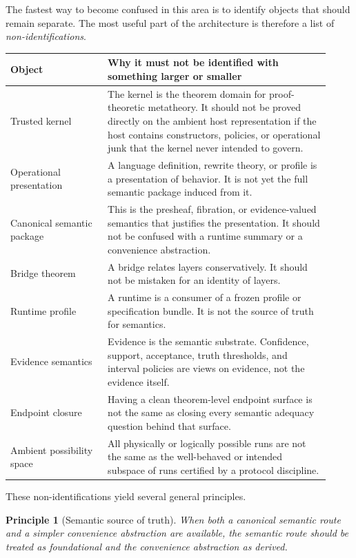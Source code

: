 \documentclass[11pt]{article}
\newtheorem{principle}{Principle}
\begin{document}
The fastest way to become confused in this area is to identify objects that should remain separate. The most useful part of the architecture is therefore a list of \emph{non-identifications}.

\begin{center}
\begin{tabular}{p{0.28\linewidth} p{0.64\linewidth}}
\toprule
Object & Why it must not be identified with something larger or smaller \\
\midrule
Trusted kernel & The kernel is the theorem domain for proof-theoretic metatheory. It should not be proved directly on the ambient host representation if the host contains constructors, policies, or operational junk that the kernel never intended to govern. \\
Operational presentation & A language definition, rewrite theory, or profile is a presentation of behavior. It is not yet the full semantic package induced from it. \\
Canonical semantic package & This is the presheaf, fibration, or evidence-valued semantics that justifies the presentation. It should not be confused with a runtime summary or a convenience abstraction. \\
Bridge theorem & A bridge relates layers conservatively. It should not be mistaken for an identity of layers. \\
Runtime profile & A runtime is a consumer of a frozen profile or specification bundle. It is not the source of truth for semantics. \\
Evidence semantics & Evidence is the semantic substrate. Confidence, support, acceptance, truth thresholds, and interval policies are views on evidence, not the evidence itself. \\
Endpoint closure & Having a clean theorem-level endpoint surface is not the same as closing every semantic adequacy question behind that surface. \\
Ambient possibility space & All physically or logically possible runs are not the same as the well-behaved or intended subspace of runs certified by a protocol discipline. \\
\bottomrule
\end{tabular}
\end{center}

These non-identifications yield several general principles.

\begin{principle}[Semantic source of truth]
When both a canonical semantic route and a simpler convenience abstraction are available, the semantic route should be treated as foundational and the convenience abstraction as derived.
\end{principle}
\end{document}
